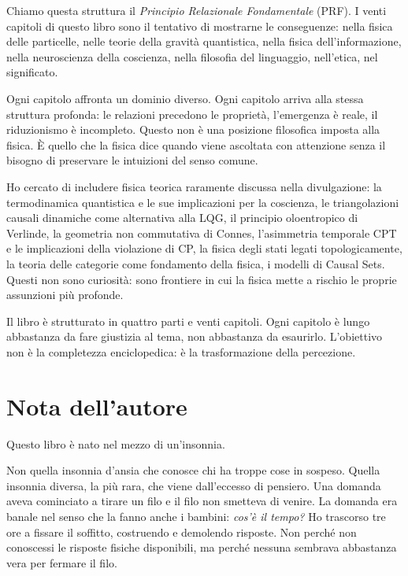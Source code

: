 \documentclass[11.5pt,a4paper,openany]{book}
\theoremstyle{remark}
\begin{document}
Chiamo questa struttura il \textit{Principio Relazionale Fondamentale} (PRF). I venti capitoli di questo libro sono il tentativo di mostrarne le conseguenze: nella fisica delle particelle, nelle teorie della gravità quantistica, nella fisica dell'informazione, nella neuroscienza della coscienza, nella filosofia del linguaggio, nell'etica, nel significato.

Ogni capitolo affronta un dominio diverso. Ogni capitolo arriva alla stessa struttura profonda: le relazioni precedono le proprietà, l'emergenza è reale, il riduzionismo è incompleto. Questo non è una posizione filosofica imposta alla fisica. È quello che la fisica dice quando viene ascoltata con attenzione senza il bisogno di preservare le intuizioni del senso comune.

Ho cercato di includere fisica teorica raramente discussa nella divulgazione: la termodinamica quantistica e le sue implicazioni per la coscienza, le triangolazioni causali dinamiche come alternativa alla LQG, il principio oloentropico di Verlinde, la geometria non commutativa di Connes, l'asimmetria temporale CPT e le implicazioni della violazione di CP, la fisica degli stati legati topologicamente, la teoria delle categorie come fondamento della fisica, i modelli di Causal Sets. Questi non sono curiosità: sono frontiere in cui la fisica mette a rischio le proprie assunzioni più profonde.

Il libro è strutturato in quattro parti e venti capitoli. Ogni capitolo è lungo abbastanza da fare giustizia al tema, non abbastanza da esaurirlo. L'obiettivo non è la completezza enciclopedica: è la trasformazione della percezione.

\clearpage

\chapter*{Nota dell'autore}

Questo libro è nato nel mezzo di un'insonnia.

Non quella insonnia d'ansia che conosce chi ha troppe cose in sospeso. Quella insonnia diversa, la più rara, che viene dall'eccesso di pensiero. Una domanda aveva cominciato a tirare un filo e il filo non smetteva di venire. La domanda era banale nel senso che la fanno anche i bambini: \textit{cos'è il tempo?} Ho trascorso tre ore a fissare il soffitto, costruendo e demolendo risposte. Non perché non conoscessi le risposte fisiche disponibili, ma perché nessuna sembrava abbastanza vera per fermare il filo.
\end{document}
